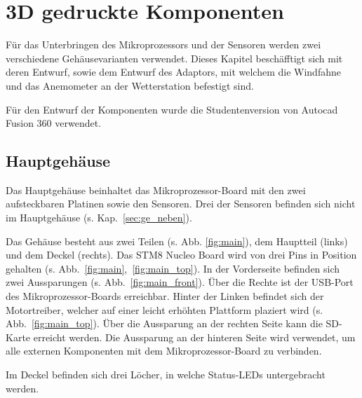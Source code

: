 \section{3D gedruckte Komponenten}\label{sec:gehaeuse}
Für das Unterbringen des Mikroprozessors und der Sensoren werden zwei verschiedene Gehäusevarianten verwendet. Dieses Kapitel beschäfftigt sich mit deren Entwurf, sowie dem Entwurf des Adaptors, mit welchem die Windfahne und das Anemometer an der Wetterstation befestigt sind.

Für den Entwurf der Komponenten wurde die Studentenversion von Autocad Fusion 360 verwendet.

\subsection{Hauptgehäuse}\label{sec:ge_haupt}
Das Hauptgehäuse beinhaltet das Mikroprozessor-Board mit den zwei aufsteckbaren Platinen sowie den Sensoren. Drei der Sensoren befinden sich nicht im Hauptgehäuse (s. Kap.~\ref{sec:ge_neben}).

Das Gehäuse besteht aus zwei Teilen (s. Abb. \ref{fig:main}), dem Hauptteil (links) und dem Deckel (rechts). Das STM8 Nucleo Board wird von drei Pins in Position gehalten (s. Abb.~\ref{fig:main},~\ref{fig:main_top}). In der Vorderseite befinden sich zwei Aussparungen (s. Abb.~\ref{fig:main_front}). Über die Rechte ist der USB-Port des Mikroprozessor-Boards erreichbar. Hinter der Linken befindet sich der Motortreiber, welcher auf einer leicht erhöhten Plattform plaziert wird (s. Abb.~\ref{fig:main_top}). Über die Aussparung an der rechten Seite kann die SD-Karte erreicht werden. Die Aussparung an der hinteren Seite wird verwendet, um alle externen Komponenten mit dem Mikroprozessor-Board zu verbinden.

Im Deckel befinden sich drei Löcher, in welche Status-LEDs untergebracht werden.

